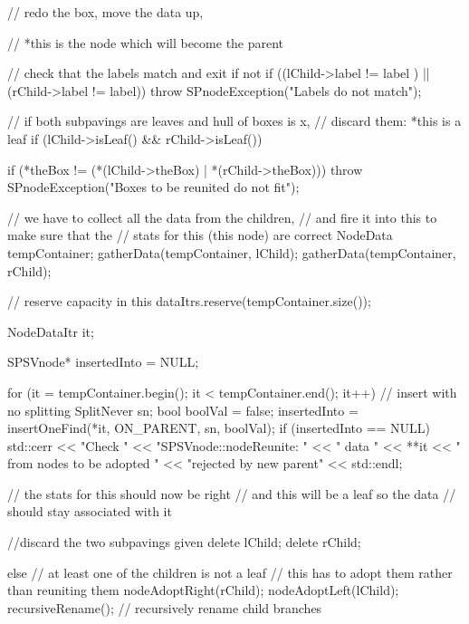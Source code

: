 \begin{DoxyCode}
    {
        // redo the box, move the data up,

        // *this is the node which will become the parent

        // check that the labels match and exit if not
        if ((lChild->label != label ) || (rChild->label != label)) {
            throw SPnodeException("Labels do not match");
        }

        // if both subpavings are leaves and hull of boxes is x,
        // discard them: *this is a leaf
        if (lChild->isLeaf() && rChild->isLeaf()) {
            if (*theBox !=
                (*(lChild->theBox) | *(rChild->theBox))) {
                throw SPnodeException("Boxes to be reunited do not fit");
            }

            // we have to collect all the data from the children,
            // and fire it into this to make sure that the
            // stats for this (this node) are correct
            NodeData tempContainer;
            gatherData(tempContainer, lChild);
            gatherData(tempContainer, rChild);

            // reserve capacity in this
            dataItrs.reserve(tempContainer.size());

            NodeDataItr it;

            SPSVnode* insertedInto = NULL;

            for (it = tempContainer.begin();
                it < tempContainer.end(); it++) {
                // insert with no splitting
                SplitNever sn;
                bool boolVal = false;
                insertedInto = insertOneFind(*it, ON_PARENT, sn, boolVal);
                if (insertedInto == NULL) {
                    std::cerr << "Check "
                        << "SPSVnode::nodeReunite: "
                        << " data " << **it
                        << " from nodes to be adopted "
                        << "rejected by new parent"
                        << std::endl;
                }
            }

            // the stats for this should now be right
            // and this will be a leaf so the data
            // should stay associated with it

            //discard the two subpavings given
            delete lChild;
            delete rChild;

        }

        else {  // at least one of the children is not a leaf
            // this has to adopt them rather than reuniting them
            nodeAdoptRight(rChild);
            nodeAdoptLeft(lChild);
            recursiveRename(); // recursively rename child branches
        }
    }
\end{DoxyCode}
